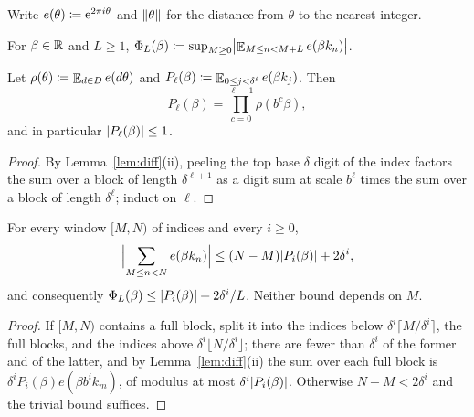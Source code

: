 Write $e(\theta) \coloneqq \mathrm{e}^{2\pi i \theta}$ and $\lVert \theta \rVert$ for the distance from
$\theta$ to the nearest integer.

\begin{definition}
  \label{def:Phi}
  \leanok
  For $\beta \in \mathbb{R}$ and $L \geq 1$,
  $\Phi_L(\beta) \coloneqq \sup_{M \geq 0} \bigl\lvert \mathop{\mathbb{E}}_{M \leq n < M+L} e(\beta k_n) \bigr\rvert$.
\end{definition}

\begin{lemma}
  \label{lem:blockAvg}
  \leanok
  Let $\rho(\theta) \coloneqq \mathop{\mathbb{E}}_{d \in D} e(d\theta)$ and
  $P_\ell(\beta) \coloneqq \mathop{\mathbb{E}}_{0 \leq j < \delta^\ell} e(\beta k_j)$.  Then
  \[ P_\ell(\beta) = \prod_{c=0}^{\ell-1} \rho(b^c \beta) , \]
  and in particular $\lvert P_\ell(\beta) \rvert \leq 1$.
\end{lemma}

\begin{proof}
  \leanok
  By Lemma~\ref{lem:diff}(ii), peeling the top base $\delta$ digit of the index factors the sum
  over a block of length $\delta^{\ell+1}$ as a digit sum at scale $b^\ell$ times the sum over a
  block of length $\delta^\ell$; induct on $\ell$.
\end{proof}

\begin{lemma}
  \label{lem:window-split}
  \leanok
  For every window $[M,N)$ of indices and every $i \geq 0$,
  \[
    \Bigl\lvert \sum_{M \leq n < N} e(\beta k_n) \Bigr\rvert
      \leq (N-M)\lvert P_i(\beta) \rvert + 2\delta^i ,
  \]
  and consequently $\Phi_L(\beta) \leq \lvert P_i(\beta) \rvert + 2\delta^i/L$.  Neither bound depends
  on $M$.
\end{lemma}

\begin{proof}
  \leanok
  If $[M,N)$ contains a full block, split it into the indices below $\delta^i\lceil M/\delta^i\rceil$,
  the full blocks, and the indices above $\delta^i\lfloor N/\delta^i\rfloor$; there are fewer than
  $\delta^i$ of the former and of the latter, and by Lemma~\ref{lem:diff}(ii) the sum over each
  full block is $\delta^i P_i(\beta) e(\beta b^i k_m)$, of modulus at most $\delta^i\lvert P_i(\beta) \rvert$.
  Otherwise $N - M < 2\delta^i$ and the trivial bound suffices.
\end{proof}

